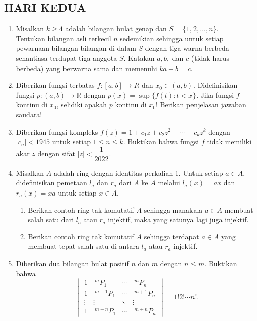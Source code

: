 \documentclass[12pt,twoside]{article}
\begin{document}
\subsection{HARI KEDUA}
\begin{enumerate}
    \item Misalkan $k\geq 4$ adalah bilangan bulat genap dan $S=\{1,2,\dots,n\}$.\\
          Tentukan bilangan asli terkecil $n$ sedemikian sehingga untuk setiap pewarnaan bilangan-bilangan di dalam $S$ dengan tiga warna berbeda senantiasa terdapat tiga anggota $S$. Katakan $a,b,$ dan $c$ (tidak harus berbeda) yang berwarna sama dan memenuhi $ ka+b =c.$
    \item Diberikan fungsi terbatas $f:[a,b]\rightarrow R$ dan $x_0\in (a,b) $.	Didefinisikan fungsi $p:(a,b)\rightarrow \mathbb{R}$ dengan $ p(x)=\sup\{f(t):t<x\} $. Jika fungsi $f$ kontinu di $x_0$, selidiki apakah $p$ kontinu di $x_0$! Berikan penjelasan jawaban saudara!
    \item Diberikan fungsi kompleks
          $ f(z)=1+c_1z+c_2z^2+\cdots +c_kz^k $
          dengan $|c_n|<1945$ untuk setiap $1\leq n\leq k$. Buktikan bahwa fungsi $f$ tidak memiliki akar $z$ dengan sifat $ |z|<\dfrac{1}{2022} $.
    \item Misalkan $A$ adalah ring dengan identitas perkalian 1. Untuk setiap $a\in A$, didefinisikan pemetaan $l_a$ dan $r_a$ dari $A$ ke $A$ melalui $l_a(x)=ax$ dan $r_a(x)=xa$ untuk setiap $x\in A$.
          \begin{enumerate}
              \item Berikan contoh ring tak komutatif $A$ sehingga manakala $a\in A$ membuat salah satu dari $l_a$ atau $r_a$ injektif, maka yang satunya lagi juga injektif.
              \item Berikan contoh ring tak komutatif $A$ sehingga terdapat $a\in A$ yang membuat tepat salah satu di antara $l_a$ atau $r_a$ injektif.
          \end{enumerate}
    \item Diberikan dua bilangan bulat positif $n$ dan $m$ dengan $n\leq m$. Buktikan bahwa
          $$ \begin{vmatrix}
                  1      & ~^mP_1     & \cdots & ~^mP_n     \\
                  1      & ~^{m+1}P_1 & \cdots & ~^{m+1}P_n \\
                  \vdots & \vdots     & \ddots & \vdots     \\
                  1      & ~^{m+n}P_1 & \cdots & ~^{m+n}P_n
              \end{vmatrix}	= 1!2!\cdots n!.	 $$
\end{enumerate}
\end{document}
